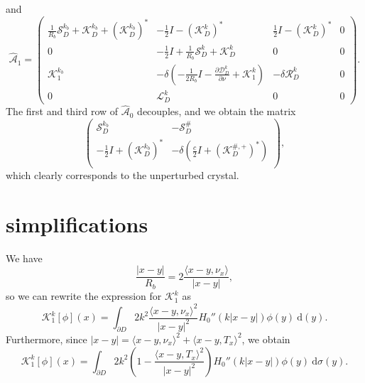 \documentclass[a4paper]{article}
\theoremstyle{definition}
\newcommand{\D}{\mathcal{D}}
\newcommand{\A}{\mathcal{A}}
\renewcommand{\L}{\mathcal{L}}
\renewcommand{\S}{\mathcal{S}}
\newcommand{\K}{\mathcal{K}}
\newcommand{\dx}{\: \mathrm{d}}
\newcommand{\Scrystal}{\mathcal{S}_D^\#}
\begin{document}
and
\begin{equation} \label{eq:Ahat1}
\hat{\A}_1 = 
\begin{pmatrix}
\frac{1}{R_b}\S_D^{k_b} + \K_D^{k_b} + \left(\K_D^{k_b}\right)^* &  -\frac{1}{2}I - \left(\K_D^k\right)^* & \frac{1}{2}I - \left(\K_D^k\right)^* & 0 \\
0 & -\frac{1}{2}I+ \frac{1}{R_b}\S_D^k + \K_D^k  & 0 & 0 \\
\K_1^{k_b} & -\delta\left(-\frac{1}{2R_b}I-\frac{\partial\D_D^k}{\partial \nu}+\K_1^k\right) & -\delta \mathcal{R}_D^k & 0 \\
0 & \L_D^k & 0 & 0
\end{pmatrix}.
\end{equation}
The first and third row of $\hat{\A}_0$ decouples, and we obtain the matrix
\begin{equation*}
\begin{pmatrix}
\S_{D}^{k_b} & -\Scrystal \\
-\frac{1}{2}I+ (\K_{D}^{k_b})^* & -\delta\left( \frac{c}{2}I+ \left(\K_D^{\#,+}\right)^*\right)\\
\end{pmatrix}, 
\end{equation*}
which clearly corresponds to the unperturbed crystal. 

\section{simplifications}

We have
\begin{equation*}
\frac{|x-y|}{R_b}=2\frac{\langle x-y,\nu_x\rangle}{|x-y|},
\end{equation*}
so we can rewrite the expression for $\K_1^k$ as 
\begin{equation*}
\K_1^k[\phi](x) = \int_{\partial D} 2k^2 \frac{\langle x-y,\nu_x\rangle^2}{|x-y|^2} H_0''(k|x-y|) \phi(y) \dx (y).
\end{equation*}
Furthermore, since $|x-y|=\langle x-y, \nu_x \rangle^2 + \langle x-y, T_x \rangle^2 $, we obtain
\begin{equation*}
\K_1^k[\phi](x) = \int_{\partial D} 2k^2 \left(1- \frac{\langle x-y,T_x\rangle^2}{|x-y|^2} \right)H_0''(k|x-y|) \phi(y) \dx\sigma (y).
\end{equation*}
\end{document}
